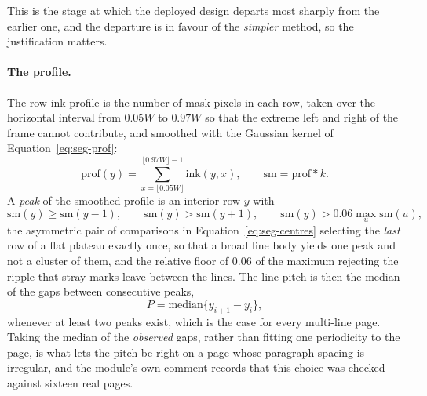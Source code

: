 This is the stage at which the deployed design departs most sharply from the earlier one, and the departure is in favour of the \emph{simpler} method, so the justification matters.

\paragraph{The profile.}
The row-ink profile is the number of mask pixels in each row, taken over the horizontal interval from $0.05W$ to $0.97W$ so that the extreme left and right of the frame cannot contribute, and smoothed with the Gaussian kernel of Equation~\ref{eq:seg-prof}:
\begin{equation}
\mathrm{prof}(y)=\sum_{x=\lfloor0.05W\rfloor}^{\lfloor0.97W\rfloor-1}\mathrm{ink}(y,x),\qquad \mathrm{sm}=\mathrm{prof}*k .
\label{eq:seg-pitch}
\end{equation}
A \emph{peak} of the smoothed profile is an interior row $y$ with
\begin{equation}
\mathrm{sm}(y)\ge\mathrm{sm}(y-1),\qquad \mathrm{sm}(y)>\mathrm{sm}(y+1),\qquad \mathrm{sm}(y)>0.06\max_u\mathrm{sm}(u),
\label{eq:seg-centres}
\end{equation}
the asymmetric pair of comparisons in Equation~\ref{eq:seg-centres} selecting the \emph{last} row of a flat plateau exactly once, so that a broad line body yields one peak and not a cluster of them, and the relative floor of $0.06$ of the maximum rejecting the ripple that stray marks leave between the lines.
The line pitch is then the median of the gaps between consecutive peaks,
\begin{equation*}
P=\mathrm{median}\bigl\{y_{i+1}-y_i\bigr\},
\end{equation*}
whenever at least two peaks exist, which is the case for every multi-line page.
Taking the median of the \emph{observed} gaps, rather than fitting one periodicity to the page, is what lets the pitch be right on a page whose paragraph spacing is irregular, and the module's own comment records that this choice was checked against sixteen real pages.

